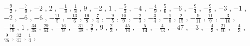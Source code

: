 \documentclass[12pt]{article}
\theoremstyle{note}
\begin{document}
\begin{flushleft}
$ \scriptstyle- \frac{9}{2}$ , $ \scriptstyle- \frac{7}{9}$ , $ \scriptstyle-2$ , $ \scriptstyle2$ , $ \scriptstyle- \frac{1}{8}$ , $ \scriptstyle\frac{1}{8}$ , $ \scriptstyle9$ , $ \scriptstyle-2$ , $ \scriptstyle1$ , $ \scriptstyle- \frac{5}{3}$ , $ \scriptstyle-4$ , $ \scriptstyle- \frac{4}{9}$ , $ \scriptstyle\frac{5}{6}$ , $ \scriptstyle-6$ , $ \scriptstyle- \frac{9}{4}$ , $ \scriptstyle- \frac{9}{8}$ , $ \scriptstyle-3$ , $ \scriptstyle-1$ , $ \scriptstyle-2$ , $ \scriptstyle-6$ , $ \scriptstyle-6$ , $ \scriptstyle- \frac{11}{5}$ , $ \scriptstyle- \frac{13}{6}$ , $ \scriptstyle\frac{19}{8}$ , $ \scriptstyle\frac{7}{4}$ , $ \scriptstyle- \frac{9}{5}$ , $ \scriptstyle\frac{10}{9}$ , $ \scriptstyle- \frac{2}{3}$ , $ \scriptstyle- \frac{3}{4}$ , $ \scriptstyle- \frac{1}{8}$ , $ \scriptstyle\frac{2}{15}$ , $ \scriptstyle- \frac{9}{11}$ , $ \scriptstyle\frac{11}{9}$ , $ \scriptstyle- \frac{3}{16}$ , $ \scriptstyle- \frac{16}{19}$ , $ \scriptstyle1$ , $ \scriptstyle\frac{34}{35}$ , $ \scriptstyle\frac{29}{54}$ , $ \scriptstyle- \frac{16}{9}$ , $ \scriptstyle- \frac{31}{48}$ , $ \scriptstyle\frac{2}{7}$ , $ \scriptstyle9$ , $ \scriptstyle\frac{2}{3}$ , $ \scriptstyle- \frac{45}{16}$ , $ \scriptstyle- \frac{5}{14}$ , $ \scriptstyle- \frac{4}{13}$ , $ \scriptstyle-47$ , $ \scriptstyle-3$ , $ \scriptstyle- \frac{4}{3}$ , $ \scriptstyle\frac{21}{10}$ , $ \scriptstyle- \frac{4}{3}$ , $ \scriptstyle\frac{9}{25}$ , $ \scriptstyle\frac{32}{41}$ , $ \scriptstyle\frac{1}{4}$ , \end{flushleft} 
    
\end{document}
